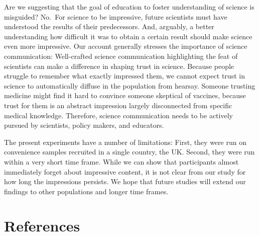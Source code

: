\documentclass[
  doc,floatsintext]{apa6}
\begin{document}
Are we suggesting that the goal of education to foster understanding of science is misguided? No.~For science to be impressive, future scientists must have understood the results of their predecessors. And, arguably, a better understanding how difficult it was to obtain a certain result should make science even more impressive. Our account generally stresses the importance of science communication: Well-crafted science communication highlighting the feat of scientists can make a difference in shaping trust in science. Because people struggle to remember what exactly impressed them, we cannot expect trust in science to automatically diffuse in the population from hearsay. Someone trusting medicine might find it hard to convince someone skeptical of vaccines, because trust for them is an abstract impression largely disconnected from specific medical knowledge. Therefore, science communication needs to be actively pursued by scientists, policy makers, and educators.

The present experiments have a number of limitations: First, they were run on convenience samples recruited in a single country, the UK. Second, they were run within a very short time frame. While we can show that participants almost immediately forget about impressive content, it is not clear from our study for how long the impressions persists. We hope that future studies will extend our findings to other populations and longer time frames.

\FloatBarrier

\section{References}\label{references}
\end{document}
